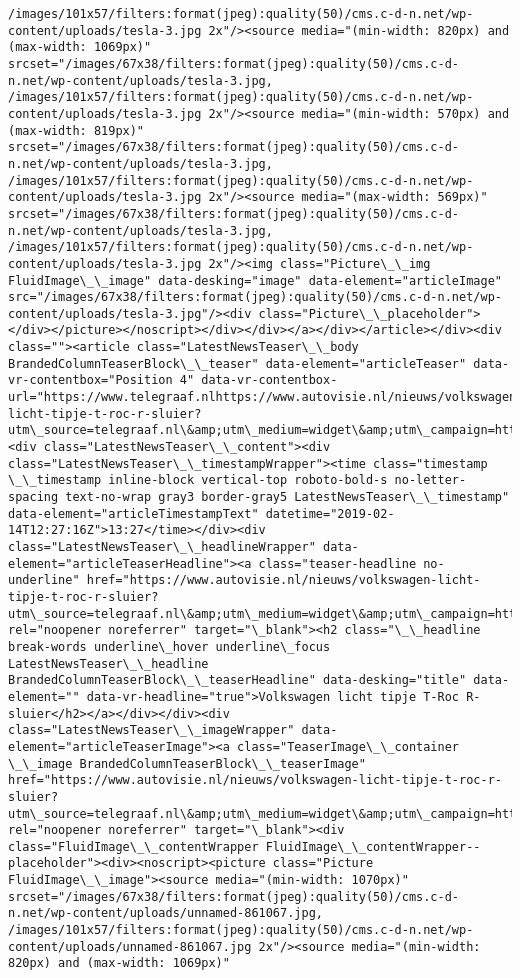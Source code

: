 \documentclass[11pt]{article}
\begin{document}
\begin{Verbatim}[commandchars=\\\{\}]
/images/101x57/filters:format(jpeg):quality(50)/cms.c-d-n.net/wp-content/uploads/tesla-3.jpg 2x"/><source media="(min-width: 820px) and (max-width: 1069px)" srcset="/images/67x38/filters:format(jpeg):quality(50)/cms.c-d-n.net/wp-content/uploads/tesla-3.jpg, /images/101x57/filters:format(jpeg):quality(50)/cms.c-d-n.net/wp-content/uploads/tesla-3.jpg 2x"/><source media="(min-width: 570px) and (max-width: 819px)" srcset="/images/67x38/filters:format(jpeg):quality(50)/cms.c-d-n.net/wp-content/uploads/tesla-3.jpg, /images/101x57/filters:format(jpeg):quality(50)/cms.c-d-n.net/wp-content/uploads/tesla-3.jpg 2x"/><source media="(max-width: 569px)" srcset="/images/67x38/filters:format(jpeg):quality(50)/cms.c-d-n.net/wp-content/uploads/tesla-3.jpg, /images/101x57/filters:format(jpeg):quality(50)/cms.c-d-n.net/wp-content/uploads/tesla-3.jpg 2x"/><img class="Picture\_\_img FluidImage\_\_image" data-desking="image" data-element="articleImage" src="/images/67x38/filters:format(jpeg):quality(50)/cms.c-d-n.net/wp-content/uploads/tesla-3.jpg"/><div class="Picture\_\_placeholder"></div></picture></noscript></div></div></a></div></article></div><div class=""><article class="LatestNewsTeaser\_\_body BrandedColumnTeaserBlock\_\_teaser" data-element="articleTeaser" data-vr-contentbox="Position 4" data-vr-contentbox-url="https://www.telegraaf.nlhttps://www.autovisie.nl/nieuws/volkswagen-licht-tipje-t-roc-r-sluier?utm\_source=telegraaf.nl\&amp;utm\_medium=widget\&amp;utm\_campaign=https://www.telegraaf.nl/"><div class="LatestNewsTeaser\_\_content"><div class="LatestNewsTeaser\_\_timestampWrapper"><time class="timestamp \_\_timestamp inline-block vertical-top roboto-bold-s no-letter-spacing text-no-wrap gray3 border-gray5 LatestNewsTeaser\_\_timestamp" data-element="articleTimestampText" datetime="2019-02-14T12:27:16Z">13:27</time></div><div class="LatestNewsTeaser\_\_headlineWrapper" data-element="articleTeaserHeadline"><a class="teaser-headline no-underline" href="https://www.autovisie.nl/nieuws/volkswagen-licht-tipje-t-roc-r-sluier?utm\_source=telegraaf.nl\&amp;utm\_medium=widget\&amp;utm\_campaign=https://www.telegraaf.nl/" rel="noopener noreferrer" target="\_blank"><h2 class="\_\_headline break-words underline\_hover underline\_focus LatestNewsTeaser\_\_headline BrandedColumnTeaserBlock\_\_teaserHeadline" data-desking="title" data-element="" data-vr-headline="true">Volkswagen licht tipje T-Roc R-sluier</h2></a></div></div><div class="LatestNewsTeaser\_\_imageWrapper" data-element="articleTeaserImage"><a class="TeaserImage\_\_container \_\_image BrandedColumnTeaserBlock\_\_teaserImage" href="https://www.autovisie.nl/nieuws/volkswagen-licht-tipje-t-roc-r-sluier?utm\_source=telegraaf.nl\&amp;utm\_medium=widget\&amp;utm\_campaign=https://www.telegraaf.nl/" rel="noopener noreferrer" target="\_blank"><div class="FluidImage\_\_contentWrapper FluidImage\_\_contentWrapper--placeholder"><div><noscript><picture class="Picture FluidImage\_\_image"><source media="(min-width: 1070px)" srcset="/images/67x38/filters:format(jpeg):quality(50)/cms.c-d-n.net/wp-content/uploads/unnamed-861067.jpg, /images/101x57/filters:format(jpeg):quality(50)/cms.c-d-n.net/wp-content/uploads/unnamed-861067.jpg 2x"/><source media="(min-width: 820px) and (max-width: 1069px)" 
\end{Verbatim}
\end{document}
